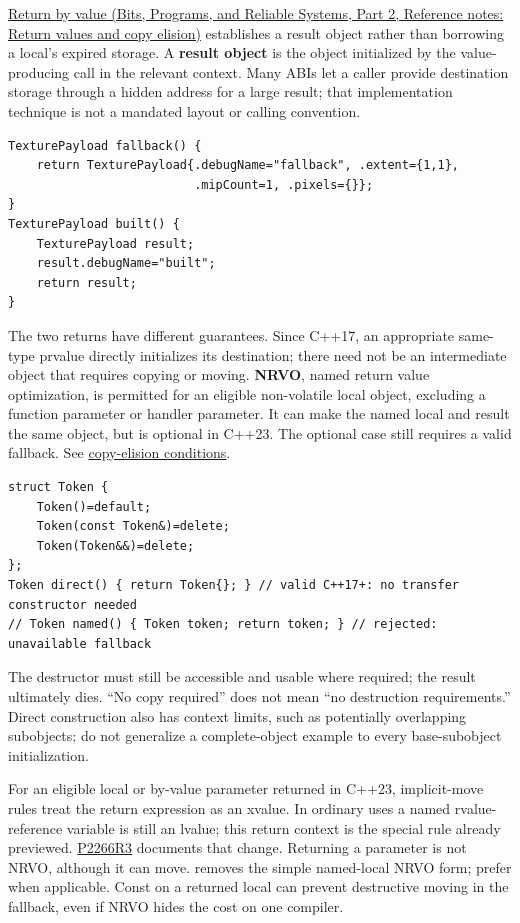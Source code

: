\hypertarget{05-engine-i-ch003-return-a-result-without-handing-out-a-lifetime-problem}{}

\href{../01-Bits-Programs-and-Reliable-Systems-P02/main.pdf\#nameddest=appendix-b08d3788c5c6}{Return by value (Bits, Programs, and Reliable Systems, Part 2, Reference notes: Return values and copy elision)} establishes a result object rather than borrowing a local's expired storage. A \textbf{result object} is the object initialized by the value-producing call in the relevant context. Many ABIs let a caller provide destination storage through a hidden address for a large result; that implementation technique is not a mandated layout or calling convention.

\begin{verbatim}
TexturePayload fallback() {
    return TexturePayload{.debugName="fallback", .extent={1,1},
                          .mipCount=1, .pixels={}};
}
TexturePayload built() {
    TexturePayload result;
    result.debugName="built";
    return result;
}
\end{verbatim}

The two returns have different guarantees. Since C++17, an appropriate same-type prvalue directly initializes its destination; there need not be an intermediate object that requires copying or moving. \textbf{NRVO}, named return value optimization, is permitted for an eligible non-volatile local object, excluding a function parameter or handler parameter. It can make the named local and result the same object, but is optional in C++23. The optional case still requires a valid fallback. See \href{https://eel.is/c++draft/class.copy.elision}{copy-elision conditions}.

\begin{verbatim}
struct Token {
    Token()=default;
    Token(const Token&)=delete;
    Token(Token&&)=delete;
};
Token direct() { return Token{}; } // valid C++17+: no transfer constructor needed
// Token named() { Token token; return token; } // rejected: unavailable fallback
\end{verbatim}

The destructor must still be accessible and usable where required; the result ultimately dies. ``No copy required'' does not mean ``no destruction requirements.'' Direct construction also has context limits, such as potentially overlapping subobjects; do not generalize a complete-object example to every base-subobject initialization.

For an eligible local or by-value parameter returned in C++23, implicit-move rules treat the return expression as an xvalue. In ordinary uses a named rvalue-reference variable is still an lvalue; this return context is the special rule already previewed. \href{https://www.open-std.org/jtc1/sc22/wg21/docs/papers/2022/p2266r3.html}{P2266R3} documents that change. Returning a parameter is not NRVO, although it can move.  removes the simple named-local NRVO form; prefer  when applicable. Const on a returned local can prevent destructive moving in the fallback, even if NRVO hides the cost on one compiler.

